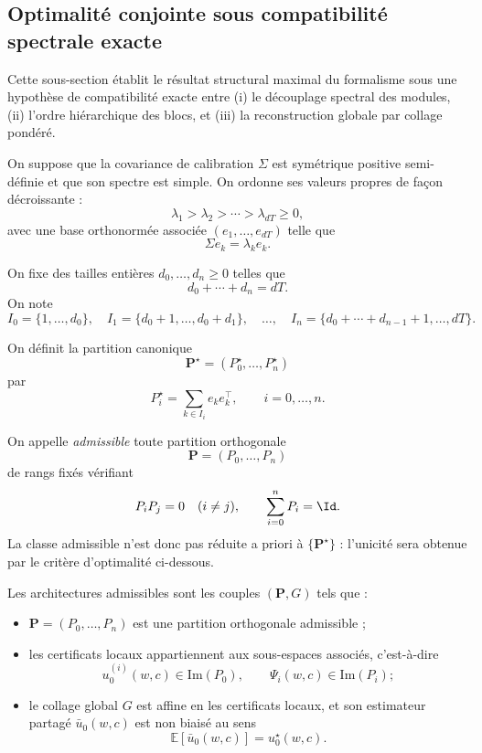 \subsection{Optimalité conjointe sous compatibilité spectrale exacte}

Cette sous-section établit le résultat structural maximal du formalisme sous une hypothèse de compatibilité exacte entre
(i) le découplage spectral des modules,
(ii) l'ordre hiérarchique des blocs, et
(iii) la reconstruction globale par collage pondéré.

\begin{assumption}
On suppose que la covariance de calibration \(\Sigma\) est symétrique positive semi-définie
et que son spectre est simple.
On ordonne ses valeurs propres de façon décroissante :
\[
\lambda_1>\lambda_2>\cdots>\lambda_{dT}\ge 0,
\]
avec une base orthonormée associée \((e_1,\dots,e_{dT})\) telle que
\[
\Sigma e_k=\lambda_k e_k.
\]

On fixe des tailles entières \(d_0,\dots,d_n\ge 0\) telles que
\[
d_0+\cdots+d_n=dT.
\]
On note
\[
I_0=\{1,\dots,d_0\},\quad
I_1=\{d_0+1,\dots,d_0+d_1\},\quad \dots,\quad
I_n=\{d_0+\cdots+d_{n-1}+1,\dots,dT\}.
\]

On définit la partition canonique
\[
\mathbf P^\star=(P_0^\star,\dots,P_n^\star)
\]
par
\[
P_i^\star=\sum_{k\in I_i} e_ke_k^\top,
\qquad i=0,\dots,n.
\]

On appelle \emph{admissible} toute partition orthogonale
\[
\mathbf P=(P_0,\dots,P_n)
\]
de rangs fixés vérifiant
\[
P_iP_j=0\quad(i\neq j),
\qquad
\sum_{i=0}^n P_i=\Id.
\]
La classe admissible n'est donc pas réduite a priori à \(\{\mathbf P^\star\}\) :
l'unicité sera obtenue par le critère d'optimalité ci-dessous.
\end{assumption}

\begin{assumption}
Les architectures admissibles sont les couples \((\mathbf P,G)\) tels que :

\begin{itemize}[leftmargin=2em]
    \item \(\mathbf P=(P_0,\dots,P_n)\) est une partition orthogonale admissible ;
    \item les certificats locaux appartiennent aux sous-espaces associés, c'est-à-dire
    \[
    u_0^{(i)}(w,c)\in \mathrm{Im}(P_0),
    \qquad
    \Psi_i(w,c)\in \mathrm{Im}(P_i);
    \]
    \item le collage global \(G\) est affine en les certificats locaux, et son estimateur partagé
    \(\bar u_0(w,c)\) est non biaisé au sens
    \[
    \mathbb E[\bar u_0(w,c)]=u_0^\star(w,c).
    \]
\end{itemize}
\end{assumption}

